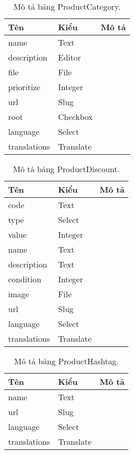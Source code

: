 \begin{table}[h!]
\begin{center}
\begin{tabular}{ |l|l|l| } 
	\hline
	Tên & Kiểu & Mô tả \\
	\hline
	name & Text & \dotfill \\
description & Editor & \dotfill \\
file & File & \dotfill \\
prioritize & Integer & \dotfill \\
url & Slug & \dotfill \\
root & Checkbox & \dotfill \\
language & Select & \dotfill \\
translations & Translate & \dotfill \\ 
	\hline
\end{tabular}
	\caption{Mô tả bảng ProductCategory.}
	\label{table:ProductCategory}
\end{center}
\end{table}


\begin{table}[h!]
\begin{center}
\begin{tabular}{ |l|l|l| } 
	\hline
	Tên & Kiểu & Mô tả \\
	\hline
	code & Text & \dotfill \\
type & Select & \dotfill \\
value & Integer & \dotfill \\
name & Text & \dotfill \\
description & Text & \dotfill \\
condition & Integer & \dotfill \\
image & File & \dotfill \\
url & Slug & \dotfill \\
language & Select & \dotfill \\
translations & Translate & \dotfill \\ 
	\hline
\end{tabular}
	\caption{Mô tả bảng ProductDiscount.}
	\label{table:ProductDiscount}
\end{center}
\end{table}


\begin{table}[h!]
\begin{center}
\begin{tabular}{ |l|l|l| } 
	\hline
	Tên & Kiểu & Mô tả \\
	\hline
	name & Text & \dotfill \\
url & Slug & \dotfill \\
language & Select & \dotfill \\
translations & Translate & \dotfill \\ 
	\hline
\end{tabular}
	\caption{Mô tả bảng ProductHashtag.}
	\label{table:ProductHashtag}
\end{center}
\end{table}


